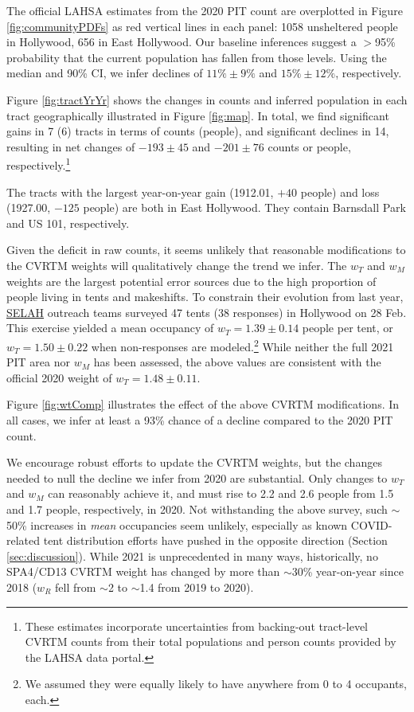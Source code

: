 \documentclass[11pt,twocolumn]{article}
\def\resp{respectively}
\begin{document}
The official LAHSA estimates from the 2020 PIT count are overplotted in Figure \ref{fig:communityPDFs} 
as red vertical lines in each panel: 1058 unsheltered people in Hollywood, 656 in East Hollywood.
Our baseline inferences suggest a $>$95\% probability that the current population has fallen from 
those levels. Using the median and 90\% CI, we infer declines of $11\%\pm9\%$ and $15\%\pm12\%$, \resp. 

Figure \ref{fig:tractYrYr} shows the changes in counts and inferred population in each tract 
geographically illustrated in Figure \ref{fig:map}. In total, we find significant gains in 7 (6)
tracts in terms of counts (people), and significant declines in 14, resulting in net changes of $-193\pm45$
and $-201\pm76$ counts or people, \resp.\footnote{These estimates incorporate uncertainties 
from backing-out tract-level CVRTM counts from their total populations and person counts provided
by the LAHSA data portal.}

The tracts with the largest year-on-year gain (1912.01, $+40$ people) and loss (1927.00, $-125$ people)
are both in East Hollywood. They contain Barnsdall Park and US 101, \resp. 


Given the deficit in raw counts, it seems unlikely that reasonable modifications to the CVRTM weights 
will qualitatively change the trend we infer. The $w_{T}$ and $w_{M}$ weights are the largest potential error 
sources due to the high proportion of people living in tents and makeshifts. To constrain their evolution
from last year, \href{https://selahnhc.org}{SELAH} outreach teams surveyed 47 tents (38 responses) 
in Hollywood on 28 Feb. This exercise yielded a mean occupancy of $w_{T}=1.39\pm0.14$ people per tent, 
or $w_{T}=1.50\pm0.22$ when non-responses are modeled.\footnote{We assumed they were equally likely to have anywhere 
from 0 to 4 occupants, each.} While neither the full 2021 PIT area nor $w_{M}$ has been assessed, the 
above values are consistent with the official 2020 weight of $w_{T}=1.48\pm0.11$. 

Figure \ref{fig:wtComp} illustrates the effect of the above CVRTM modifications. In all cases, we infer at 
least a 93\% chance of a decline compared to the 2020 PIT count.

We encourage robust efforts to update the CVRTM weights, but the changes needed to null the 
decline we infer from 2020 are substantial. Only changes to $w_{T}$ and $w_{M}$ can reasonably 
achieve it, and must rise to 2.2 and 2.6 people from 1.5 and 1.7 people, \resp, in 2020. Not withstanding
the above survey, such $\sim$50\% increases in {\it mean} occupancies seem unlikely, especially as
known COVID-related tent distribution efforts have pushed in the opposite direction (Section 
\ref{sec:discussion}). While 2021 is unprecedented in many ways, historically, no SPA4/CD13 
CVRTM weight has changed by more than $\sim$30\% year-on-year since 2018 
($w_{R}$ fell from $\sim$2 to $\sim$1.4 from 2019 to 2020).
\end{document}
